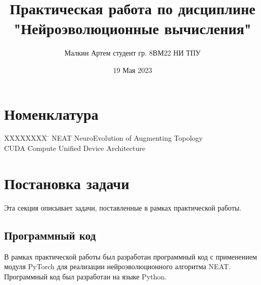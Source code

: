 \documentclass{article}
\title{Практическая работа по дисциплине "Нейроэволюционные вычисления"}
\author{Малкин Артем студент гр. 8ВМ22 НИ ТПУ}
\date{19 Мая 2023}
\begin{document}
\maketitle


\section*{Номенклатура}
\label{sec:nomenclature}
\begin{tabbing}
    XXXXXXXX \= \kill%
	NEAT				\> NeuroEvolution of Augmenting Topology\\    
	CUDA 				\> Compute Unified Device Architecture	
\end{tabbing}

\section{Постановка задачи}
Эта секция описывает задачи, поставленные в рамках практической работы.

\subsection{Программный код}
В рамках практической работы был разработан программный код с применением модуля PyTorch для реализации нейроэволюционного алгоритма NEAT. Программный код был разработан на языке Python.
\end{document}

